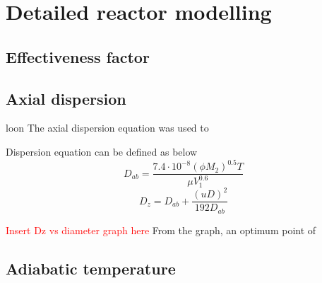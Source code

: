 \section{Detailed reactor modelling}
\subsection{Effectiveness factor}

\subsection{Axial dispersion}
loon
The axial dispersion equation was used to 

Dispersion equation can be defined as below
\begin{equation}
    D_{ab}=\frac{7.4\cdot10^{-8}(\phi M_2)^{0.5}T}{\mu V_1^{0.6}}
    \label{wilkechang}
\end{equation}
\begin{equation}
    D_z=D_{ab}+\frac{(uD)^2}{192D_{ab}}
    \label{axial dispersion coefficient}
\end{equation}

\textcolor{red}{Insert Dz vs diameter graph here} 
From the graph, an optimum point of 
\subsection{Adiabatic temperature}